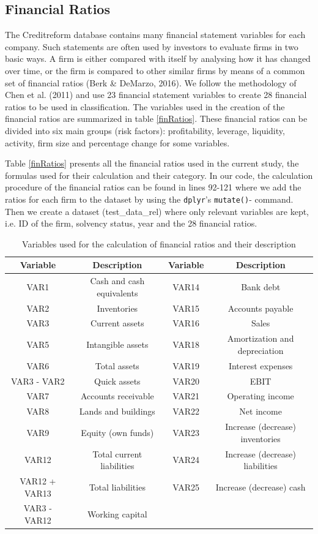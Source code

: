 \documentclass{article}
\begin{document}
\subsection{Financial Ratios}

The Creditreform database contains many financial statement variables for each company. Such statements are often used by investors to evaluate firms in two basic ways. A firm is either compared with itself by analysing how it has changed over time, or the firm is compared to other similar firms by means of a common set of financial ratios (Berk \& DeMarzo, 2016).  We follow the methodology of Chen et al. (2011) and use 23 financial statement variables to create 28 financial ratios to be used in classification. The variables used in the creation of the financial ratios are summarized in table \ref{finRatios}. These financial ratios can be divided into six main groups (risk factors): profitability, leverage, liquidity, activity, firm size and percentage change for some variables.

Table \ref{finRatios} presents all the financial ratios used in the current study, the formulas used for their calculation and their category. In our code, the calculation procedure of the financial ratios can be found in lines 92-121 where we add the ratios for each firm to the dataset by using the \texttt{dplyr}'s \texttt{mutate()}- command. Then we create a dataset (test\_data\_rel) where only relevant variables are kept, i.e. ID of the firm, solvency status, year and the 28 financial ratios. 

\begin{table}[b]
\begin{center}
\caption{Variables used for the calculation of financial ratios and their description}
\footnotesize
\begin{tabular}{cccc} 
\hline\hline
Variable  & Description & Variable & Description\\ 
\hline
VAR1 & Cash and cash equivalents & VAR14 & Bank debt\\
VAR2 & Inventories & VAR15 & Accounts payable\\
VAR3 & Current assets & VAR16 & Sales\\ 
VAR5 & Intangible assets & VAR18 & Amortization and depreciation\\
VAR6 & Total assets & VAR19 & Interest expenses\\
VAR3 - VAR2 & Quick assets & VAR20 & EBIT\\
VAR7 & Accounts receivable & VAR21 & Operating income\\
VAR8 & Lands and buildings & VAR22 & Net income\\
VAR9 & Equity (own funds) & VAR23 & Increase (decrease) inventories\\
VAR12 & Total current liabilities & VAR24 & Increase (decrease) liabilities\\
VAR12 + VAR13 & Total liabilities & VAR25 & Increase (decrease) cash\\
VAR3 - VAR12 & Working capital & &\\ 
\hline\hline
\end{tabular}
\end{center}
\end{table}
\end{document}

